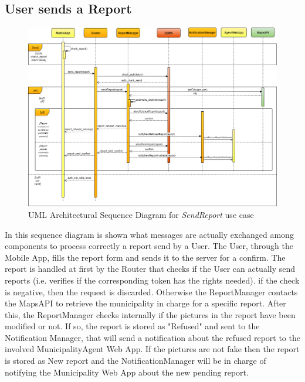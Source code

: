 \documentclass[a4paper]{report}
\begin{document}
\subsection{User sends a Report}
\begin{landscape}

\begin{figure}[hp]
\includegraphics[angle=0, scale=0.70]{ArchSequenceSendReport}
\caption{UML Architectural Sequence Diagram for \textit{SendReport} use case}
\label{fig:seq-sendReport}
\end{figure}

\end{landscape}
\restoregeometry

In this sequence diagram is shown what messages are actually exchanged among components to process correctly a report send by a User. The User, through the Mobile App, fills the report form and sends it to the server for a confirm. The report is handled at first by the Router that checks if the User can actually send reports (i.e. verifies if the corresponding token has the rights needed). if the check is negative, then the request is discarded. Otherwise the ReportManager contacts the MapsAPI to retrieve the municipality in charge for a specific report. After this, the ReportManager checks internally if the pictures in the report have been modified or not. If so, the report is stored as "Refused" and sent to the Notification Manager, that will send a notification about the refused report to the involved MunicipalityAgent Web App. If the pictures are not fake then the report is stored as New report and the NotificationManager will be in charge of notifying the Municipality Web App about the new pending report.
  
\end{document}
